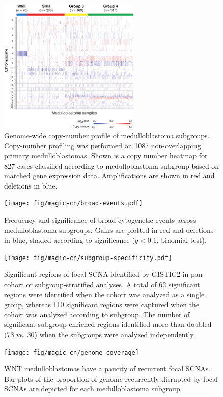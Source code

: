 \documentclass[11pt,letterpaper]{article}
\theoremstyle{definition}
\begin{document}
\begin{figure}
	\centering
	\includegraphics[width=0.6\textwidth]{fig/magic-cn/cn-heatmap.png}
	\caption{Genome-wide copy-number profile of medulloblastoma subgroups.
	Copy-number profiling was performed on 1087 non-overlapping primary medulloblastomas. Shown is a copy number heatmap for 827 cases classified according to medulloblastoma subgroup based on matched gene expression data.  Amplifications are shown in red and deletions in blue.}
	\label{fig:cn-heatmap}
\end{figure}

\begin{figure}
	\centering
	\texttt{[image: fig/magic-cn/broad-events.pdf]}
	\caption{Frequency and significance of broad cytogenetic events across medulloblastoma subgroups.
	Gains are plotted in red and deletions in blue, shaded according to significance ($q < 0.1$, binomial test).}
	\label{fig:broad-events}
\end{figure} 


\clearpage

\begin{figure}
	\centering
	\texttt{[image: fig/magic-cn/subgroup-specificity.pdf]}
	\caption{Significant regions of focal SCNA identified by GISTIC2 in pan-cohort or subgroup-stratified analyses.
	A total of 62 significant regions were identified when the cohort was analyzed as a single group, whereas 110 significant regions were captured when the cohort was analyzed according to subgroup. The number of significant subgroup-enriched regions identified more than doubled (73 vs. 30) when the subgroups were analyzed independently.}
	\label{fig:subgroup-specificity}
\end{figure}

\begin{figure}
	\centering
	\texttt{[image: fig/magic-cn/genome-coverage]}
	\caption{WNT medulloblastomas have a paucity of recurrent focal SCNAs. Bar-plots of the proportion of genome recurrently disrupted by focal SCNAs are depicted for each medulloblastoma subgroup.}
	\label{fig:genome-coverage}
\end{figure}
\end{document}
